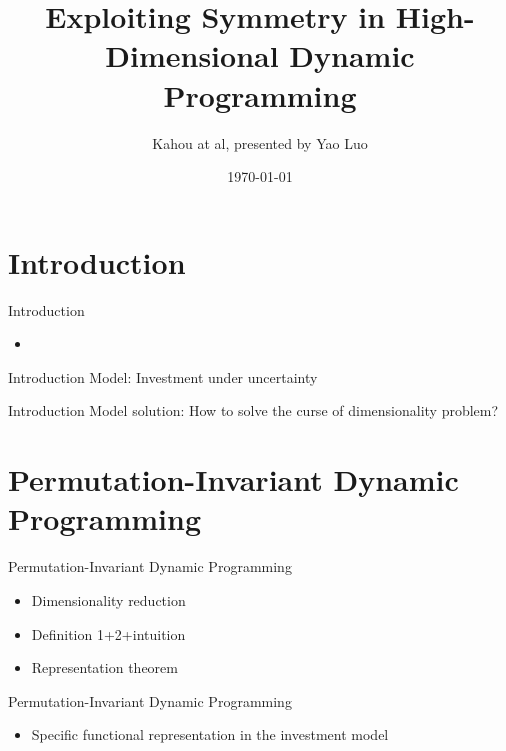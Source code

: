 \documentclass[dvipsnames,mathserif]{beamer}
\begin{document}
\rightskip\rightmargin
\title{Exploiting Symmetry in High-Dimensional Dynamic Programming}
\author{Kahou at al, presented by Yao Luo}

\footnotesize{\date{\today }


\begin{frame}
\maketitle
\end{frame}


%
\footnotesize \tableofcontents
%
\section{Introduction}
\begin{frame}{Introduction}
    \begin{itemize}
        \item 
    \end{itemize}
\end{frame}
\begin{frame}{Introduction}
Model: Investment under uncertainty
\end{frame}
\begin{frame}{Introduction}
Model solution:
How to solve the curse of dimensionality problem?
\end{frame}

\section{Permutation-Invariant Dynamic Programming}
\begin{frame}{Permutation-Invariant Dynamic Programming}
    \begin{itemize}
        \item Dimensionality reduction\\
        \vspace{0.2cm}
        \item Definition 1+2+intuition
        \vspace{0.2cm}
        \item Representation theorem
    \end{itemize}
\end{frame}
\begin{frame}{Permutation-Invariant Dynamic Programming}
    \begin{itemize}
        \item Specific functional representation in the investment model
    \end{itemize}
\end{frame}

}
\end{document}
